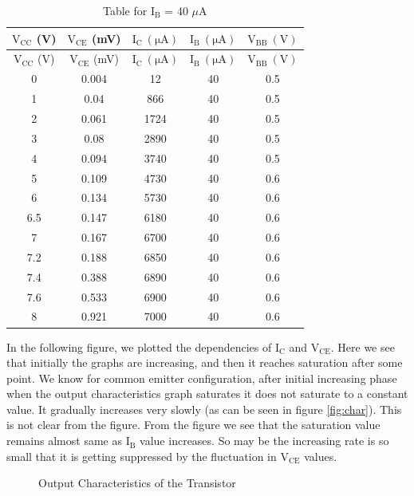 \documentclass[12pt]{article}
\begin{document}
\begin{longtable}[H]{|c|c|c|c|c|}
    \caption{Table for \( \mathrm{I_B}\) = 40 \( \mu \)A }
    \endfirsthead
    \hline
    $\mathrm{V_{CC}}$ (V) & $\mathrm{V_{CE}}$ (mV) & $\mathrm{I_C \ (\mu A)}$ & $\mathrm{I_B \ (\mu A)}$ & $\mathrm{V_{BB} \ (V)}$ \\ \hline \hline
    \endhead 
    \hline
    $\mathrm{V_{CC}}$ (V) & $\mathrm{V_{CE}}$ (mV) & $\mathrm{I_C \ (\mu A)}$ & $\mathrm{I_B \ (\mu A)}$ & $\mathrm{V_{BB} \ (V)}$ \\ \hline \hline
        0     & 0.004         & 12           & 40           & 0.5   \\  \hline
        1     & 0.04          & 866          & 40           & 0.5   \\  \hline
        2     & 0.061         & 1724         & 40           & 0.5   \\  \hline
        3     & 0.08          & 2890         & 40           & 0.5   \\  \hline
        4     & 0.094         & 3740         & 40           & 0.5   \\  \hline
        5     & 0.109         & 4730         & 40           & 0.6   \\  \hline
        6     & 0.134         & 5730         & 40           & 0.6   \\  \hline
        6.5   & 0.147         & 6180         & 40           & 0.6   \\  \hline
        7     & 0.167         & 6700         & 40           & 0.6   \\  \hline
        7.2   & 0.188         & 6850         & 40           & 0.6   \\  \hline
        7.4   & 0.388         & 6890         & 40           & 0.6   \\  \hline
        7.6   & 0.533         & 6900         & 40           & 0.6   \\  \hline
        8     & 0.921         & 7000         & 40           & 0.6   \\ \hline
\end{longtable}

In the following figure, we plotted the dependencies of $\mathrm{I_C}$ and $\mathrm{V_{CE}}$. Here we see that initially the graphs are increasing, and then it reaches saturation after some point. We know for common emitter configuration, after initial increasing phase when the output characteristics graph saturates it does not saturate to a constant value. It gradually increases very slowly (as can be seen in figure \ref{fig:char}). This is not clear from the figure. From the figure we see that the saturation value remains almost same as \( \mathrm{I_B }\) value increases. So may be the increasing rate is so small that it is getting suppressed by the fluctuation in \( \mathrm{V_{CE}}\) values. 
\begin{figure}[H]
    \centering
    
    \caption{Output Characteristics of the Transistor}
\end{figure}
\end{document}
